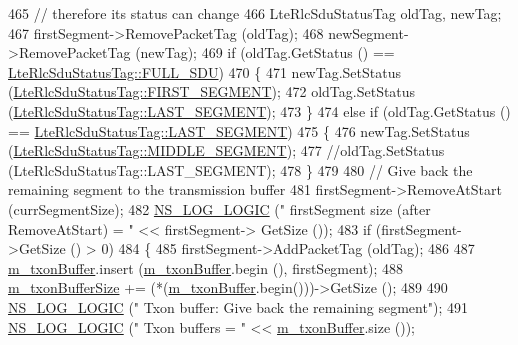 \begin{DoxyCode}
465           \textcolor{comment}{// therefore its status can change}
466           LteRlcSduStatusTag oldTag, newTag;
467           firstSegment->RemovePacketTag (oldTag);
468           newSegment->RemovePacketTag (newTag);
469           \textcolor{keywordflow}{if} (oldTag.GetStatus () == \hyperlink{classns3_1_1LteRlcSduStatusTag_ae7822c5cc0d54a3d193b09a91ed6f133ade41b0025c66cd211e992196f314d4a5}{LteRlcSduStatusTag::FULL\_SDU})
470             \{
471               newTag.SetStatus (\hyperlink{classns3_1_1LteRlcSduStatusTag_ae7822c5cc0d54a3d193b09a91ed6f133afda65e6233ba6fd1cd8aacf54cd11269}{LteRlcSduStatusTag::FIRST\_SEGMENT});
472               oldTag.SetStatus (\hyperlink{classns3_1_1LteRlcSduStatusTag_ae7822c5cc0d54a3d193b09a91ed6f133a4e59540a0a5c4530b61e4feda355be7b}{LteRlcSduStatusTag::LAST\_SEGMENT});
473             \}
474           \textcolor{keywordflow}{else} \textcolor{keywordflow}{if} (oldTag.GetStatus () == \hyperlink{classns3_1_1LteRlcSduStatusTag_ae7822c5cc0d54a3d193b09a91ed6f133a4e59540a0a5c4530b61e4feda355be7b}{LteRlcSduStatusTag::LAST\_SEGMENT})
475             \{
476               newTag.SetStatus (\hyperlink{classns3_1_1LteRlcSduStatusTag_ae7822c5cc0d54a3d193b09a91ed6f133a37a54694d337625c0c8541e3008d1d64}{LteRlcSduStatusTag::MIDDLE\_SEGMENT});
477               \textcolor{comment}{//oldTag.SetStatus (LteRlcSduStatusTag::LAST\_SEGMENT);}
478             \}
479 
480           \textcolor{comment}{// Give back the remaining segment to the transmission buffer}
481           firstSegment->RemoveAtStart (currSegmentSize);
482           \hyperlink{group__logging_ga88acd260151caf2db9c0fc84997f45ce}{NS\_LOG\_LOGIC} (\textcolor{stringliteral}{"    firstSegment size (after RemoveAtStart) = "} << firstSegment->
      GetSize ());
483           \textcolor{keywordflow}{if} (firstSegment->GetSize () > 0)
484             \{
485               firstSegment->AddPacketTag (oldTag);
486 
487               \hyperlink{classns3_1_1LteRlcAm_ad8ba4549a7c78cfe0e528d2e9cc465f8}{m\_txonBuffer}.insert (\hyperlink{classns3_1_1LteRlcAm_ad8ba4549a7c78cfe0e528d2e9cc465f8}{m\_txonBuffer}.begin (), firstSegment);
488               \hyperlink{classns3_1_1LteRlcAm_a3e8db6b5bc1d3fcc215d554e8d347eda}{m\_txonBufferSize} += (*(\hyperlink{classns3_1_1LteRlcAm_ad8ba4549a7c78cfe0e528d2e9cc465f8}{m\_txonBuffer}.begin()))->GetSize ();
489 
490               \hyperlink{group__logging_ga88acd260151caf2db9c0fc84997f45ce}{NS\_LOG\_LOGIC} (\textcolor{stringliteral}{"    Txon buffer: Give back the remaining segment"});
491               \hyperlink{group__logging_ga88acd260151caf2db9c0fc84997f45ce}{NS\_LOG\_LOGIC} (\textcolor{stringliteral}{"    Txon buffers = "} << \hyperlink{classns3_1_1LteRlcAm_ad8ba4549a7c78cfe0e528d2e9cc465f8}{m\_txonBuffer}.size ());

\end{DoxyCode}

